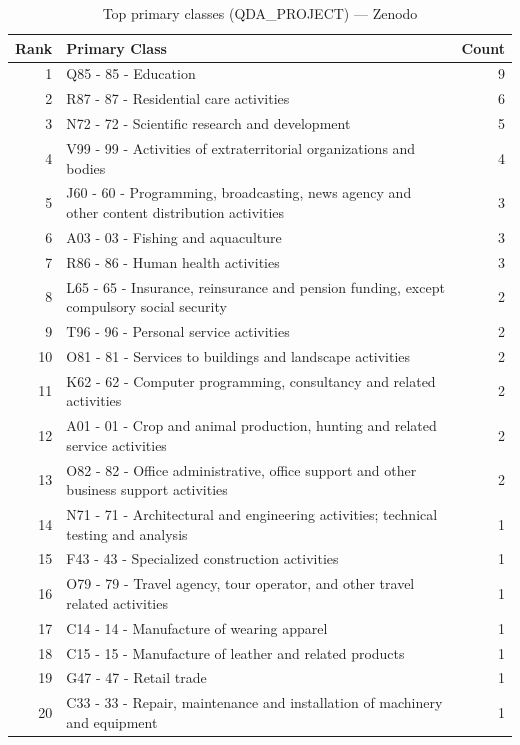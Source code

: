 \begin{table}[H]
    \centering
    \begin{tabular}{r p{10cm} r}
    \hline
    \textbf{Rank} & \textbf{Primary Class} & \textbf{Count} \\
    \hline
    1 & Q85 - 85 - Education & 9 \\
    2 & R87 - 87 - Residential care activities & 6 \\
    3 & N72 - 72 - Scientific research and development & 5 \\
    4 & V99 - 99 - Activities of extraterritorial organizations and bodies & 4 \\
    5 & J60 - 60 - Programming, broadcasting, news agency and other content distribution activities & 3 \\
    6 & A03 - 03 - Fishing and aquaculture & 3 \\
    7 & R86 - 86 - Human health activities & 3 \\
    8 & L65 - 65 - Insurance, reinsurance and pension funding, except compulsory social security & 2 \\
    9 & T96 - 96 - Personal service activities & 2 \\
    10 & O81 - 81 - Services to buildings and landscape activities & 2 \\
    11 & K62 - 62 - Computer programming, consultancy and related activities & 2 \\
    12 & A01 - 01 - Crop and animal production, hunting and related service activities & 2 \\
    13 & O82 - 82 - Office administrative, office support and other business support activities & 2 \\
    14 & N71 - 71 - Architectural and engineering activities; technical testing and analysis & 1 \\
    15 & F43 - 43 - Specialized construction activities & 1 \\
    16 & O79 - 79 - Travel agency, tour operator, and other travel related activities & 1 \\
    17 & C14 - 14 - Manufacture of wearing apparel & 1 \\
    18 & C15 - 15 - Manufacture of leather and related products & 1 \\
    19 & G47 - 47 - Retail trade & 1 \\
    20 & C33 - 33 - Repair, maintenance and installation of machinery and equipment & 1 \\
    \hline
    \end{tabular}
    \caption{Top primary classes (QDA\_PROJECT) --- Zenodo}
\end{table}


